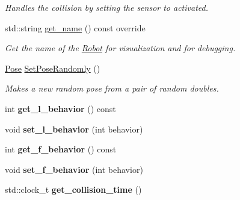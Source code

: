 \begin{DoxyCompactItemize}
\begin{DoxyCompactList}\small\item\em Handles the collision by setting the sensor to activated. \end{DoxyCompactList}\item 
std\+::string \hyperlink{classRobot_a3f77c13705b8f60480d21d8d936dc39e}{get\+\_\+name} () const override\hypertarget{classRobot_a3f77c13705b8f60480d21d8d936dc39e}{}\label{classRobot_a3f77c13705b8f60480d21d8d936dc39e}

\begin{DoxyCompactList}\small\item\em Get the name of the \hyperlink{classRobot}{Robot} for visualization and for debugging. \end{DoxyCompactList}\item 
\hyperlink{structPose}{Pose} \hyperlink{classRobot_a1e9dfd4182e05102b1b27a84d100a881}{Set\+Pose\+Randomly} ()\hypertarget{classRobot_a1e9dfd4182e05102b1b27a84d100a881}{}\label{classRobot_a1e9dfd4182e05102b1b27a84d100a881}

\begin{DoxyCompactList}\small\item\em Makes a new random pose from a pair of random doubles. \end{DoxyCompactList}\item 
int {\bfseries get\+\_\+l\+\_\+behavior} () const \hypertarget{classRobot_a415df410bff95c95922022d346950a46}{}\label{classRobot_a415df410bff95c95922022d346950a46}

\item 
void {\bfseries set\+\_\+l\+\_\+behavior} (int behavior)\hypertarget{classRobot_ab37596c15f4320e45381cc9bcd73f886}{}\label{classRobot_ab37596c15f4320e45381cc9bcd73f886}

\item 
int {\bfseries get\+\_\+f\+\_\+behavior} () const \hypertarget{classRobot_abe75a2310186f2c13d7aef758f659a5a}{}\label{classRobot_abe75a2310186f2c13d7aef758f659a5a}

\item 
void {\bfseries set\+\_\+f\+\_\+behavior} (int behavior)\hypertarget{classRobot_ae943f52ba81b2a985023eda536e5fa5c}{}\label{classRobot_ae943f52ba81b2a985023eda536e5fa5c}

\item 
std\+::clock\+\_\+t {\bfseries get\+\_\+collision\+\_\+time} ()\hypertarget{classRobot_a690c8e4cd2302c62e9daad08a24167cc}{}\label{classRobot_a690c8e4cd2302c62e9daad08a24167cc}


\end{DoxyCompactItemize}

